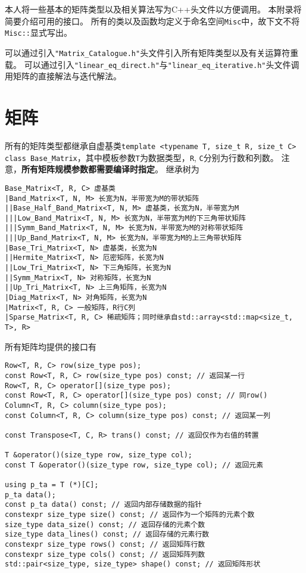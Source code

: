 本人将一些基本的矩阵类型以及相关算法写为\textsf{C++}头文件以方便调用。
本附录将简要介绍可用的接口。
所有的类以及函数均定义于命名空间\texttt{Misc}中，故下文不将\texttt{Misc::}显式写出。

可以通过引入\texttt{"Matrix\_Catalogue.h"}头文件引入所有矩阵类型以及有关运算符重载。
可以通过引入\texttt{"linear\_eq\_direct.h"}与\texttt{"linear\_eq\_iterative.h"}头文件调用矩阵的直接解法与迭代解法。

\section{矩阵}
所有的矩阵类型都继承自虚基类\texttt{template <typename T, size\_t R, size\_t C> class Base\_Matrix}，其中模板参数\texttt{T}为数据类型，\texttt{R}, \texttt{C}分别为行数和列数。
注意，\textbf{所有矩阵规模参数都需要编译时指定}。
继承树为
{
\small
\begin{verbatim}
Base_Matrix<T, R, C> 虚基类
|Band_Matrix<T, N, M> 长宽为N，半带宽为M的带状矩阵
||Base_Half_Band_Matrix<T, N, M> 虚基类，长宽为N，半带宽为M
|||Low_Band_Matrix<T, N, M> 长宽为N，半带宽为M的下三角带状矩阵
|||Symm_Band_Matrix<T, N, M> 长宽为N，半带宽为M的对称带状矩阵
|||Up_Band_Matrix<T, N, M> 长宽为N，半带宽为M的上三角带状矩阵
|Base_Tri_Matrix<T, N> 虚基类，长宽为N
||Hermite_Matrix<T, N> 厄密矩阵，长宽为N
||Low_Tri_Matrix<T, N> 下三角矩阵，长宽为N
||Symm_Matrix<T, N> 对称矩阵，长宽为N
||Up_Tri_Matrix<T, N> 上三角矩阵，长宽为N
|Diag_Matrix<T, N> 对角矩阵，长宽为N
|Matrix<T, R, C> 一般矩阵，R行C列
|Sparse_Matrix<T, R, C> 稀疏矩阵；同时继承自std::array<std::map<size_t, T>, R>
\end{verbatim}
}

所有矩阵均提供的接口有
{
\linespread{1.0}
\begin{lstlisting}
Row<T, R, C> row(size_type pos);
const Row<T, R, C> row(size_type pos) const; // 返回某一行
Row<T, R, C> operator[](size_type pos);
const Row<T, R, C> operator[](size_type pos) const; // 同row()
Column<T, R, C> column(size_type pos);
const Column<T, R, C> column(size_type pos) const; // 返回某一列

const Transpose<T, C, R> trans() const; // 返回仅作为右值的转置

T &operator()(size_type row, size_type col);
const T &operator()(size_type row, size_type col); // 返回元素

using p_ta = T (*)[C];
p_ta data();
const p_ta data() const; // 返回内部存储数据的指针
constexpr size_type size() const; // 返回作为一个矩阵的元素个数
size_type data_size() const; // 返回存储的元素个数
size_type data_lines() const; // 返回存储的元素行数
constexpr size_type rows() const; // 返回矩阵行数
constexpr size_type cols() const; // 返回矩阵列数
std::pair<size_type, size_type> shape() const; // 返回矩阵形状
\end{lstlisting}
}

